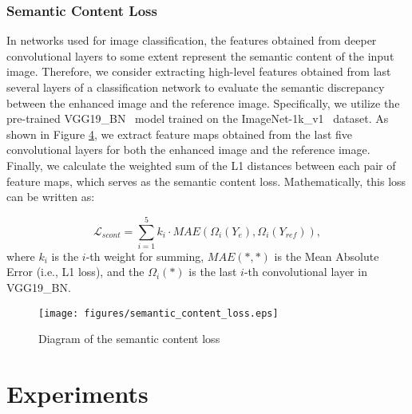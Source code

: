 \documentclass[runningheads]{llncs}
\begin{document}
\subsubsection{Semantic Content Loss}
 In networks used for image classification, the features obtained from deeper convolutional layers to some extent represent the semantic content of the input image. Therefore, we consider extracting high-level features obtained from last several layers of a classification network to evaluate the semantic discrepancy between the enhanced image and the reference image. Specifically, we utilize the pre-trained VGG19\_BN~\cite{simonyan2014very} model trained on the ImageNet-1k\_v1~\cite{imagenet15russakovsky} dataset. As shown in Figure \hyperref[scont-loss]{4}, we extract feature maps obtained from the last five convolutional layers for both the enhanced image and the reference image. Finally, we calculate the weighted sum of the L1 distances between each pair of feature maps, which serves as the semantic content loss. Mathematically, this loss can be written as:

\begin{equation}
    \mathcal{L}_{scont} = \sum_{i=1}^{5}{k_{i} \cdot MAE(\Omega_{i}(Y_{e}), \Omega_{i}(Y_{ref}))},
\end{equation}
\noindent where $k_{i}$ is the $i$-th weight for summing, $MAE(*,*)$ is the Mean Absolute Error (i.e., L1 loss), and the $\Omega_{i}(*)$ is the last $i$-th convolutional layer in VGG19\_BN.

\begin{figure}
    \centering
    \texttt{[image: figures/semantic\_content\_loss.eps]}
    \caption{Diagram of the semantic content loss}
    \label{scont-loss}
\end{figure}

\section{Experiments}\label{sec.4}
\end{document}
